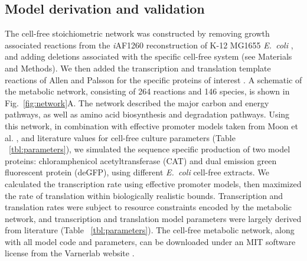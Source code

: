 \documentclass[journal=asbcd6,manuscript=article]{achemso}
\begin{document}
\subsection{Model derivation and validation}
The cell-free stoichiometric network was constructed by removing growth associated reactions from the \textit{i}AF1260 reconstruction of K-12 MG1655 \textit{E.~coli} \cite{Feist:2007aa},
and adding deletions associated with the specific cell-free system (see Materials and Methods).
We then added the transcription and translation template reactions of Allen and Palsson for the specific proteins of interest \cite{Allen:2003aa}.
A schematic of the metabolic network, consisting of 264 reactions and 146 species, is shown in Fig.~\ref{fig:network}A.
The network described the major carbon and energy pathways, as well as amino acid biosynthesis and degradation pathways.
Using this network, in combination with effective promoter models taken from Moon et al. \cite{Moon:2012ab}, and literature values for cell-free culture parameters (Table ~\ref{tbl:parameters}),
we simulated the sequence specific production of two model proteins: chloramphenicol acetyltransferase (CAT) and dual emission green fluorescent protein (deGFP), using different \textit{E.~coli} cell-free extracts.
We calculated the transcription rate using effective promoter models, then maximized the rate of translation within biologically realistic bounds.
Transcription and translation rates were subject to resource constraints encoded by the metabolic network, and transcription and translation model parameters were largely derived from literature (Table ~\ref{tbl:parameters}).
The cell-free metabolic network, along with all model code and parameters, can be downloaded under an MIT software license from the Varnerlab website \cite{varnerlab}.
\end{document}
